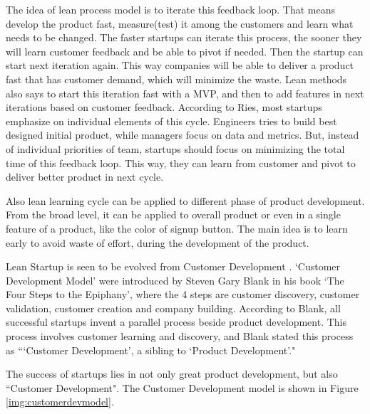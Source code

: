 The idea of lean process model is to iterate this feedback loop. That means develop the product fast, measure(test) it among the customers and learn what needs to be changed. The faster startups can iterate this process, the sooner they will learn customer feedback and be able to pivot if needed. Then the startup can start next iteration again. This way companies will be able to deliver a product fast that has customer demand, which will minimize the waste. Lean methods also says to start this iteration fast with a \ac{MVP}, and then to add features in next iterations based on customer feedback. According to Ries, most startups emphasize on individual elements of this cycle. Engineers tries to build best designed initial product, while managers focus on data and metrics. But, instead of individual priorities of team, startups should focus on minimizing the total time of this feedback loop. This way, they can learn from customer and pivot to deliver better product in next cycle.

Also lean learning cycle can be applied to different phase of product development. From the broad level, it can be applied to overall product or even in a single feature of a product, like the color of signup button. The main idea is to learn early to avoid waste of effort, during the development of the product.


Lean Startup is seen to be evolved from Customer Development \cite[p.~2]{leanvsdesign}. `Customer Development Model' were introduced by Steven Gary Blank in his book `The Four Steps to the Epiphany'\citep{fstE}, where the 4 steps are customer discovery, customer validation,
customer creation and company building. According to Blank, all successful startups invent a parallel process beside product development. This process involves customer learning and discovery, and Blank stated this process as ```Customer Development', a sibling to `Product Development'."

The success of startups lies in not only great product development, but also ``Customer Development". The Customer Development model is shown in Figure \ref{img:customerdevmodel}.

